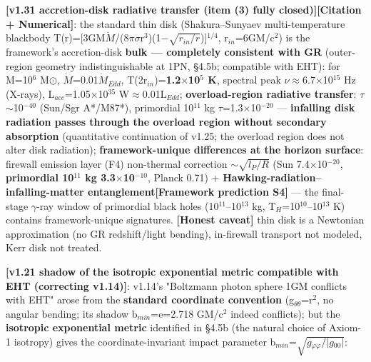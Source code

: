 \documentclass[12pt]{article}
\newcommand{\mtag}[1]{\textbf{[#1]}}
\newcommand{\up}[1]{\ensuremath{^{#1}}}
\newcommand{\down}[1]{\ensuremath{_{#1}}}
\begin{document}
\textbf{\mtag{v1.31 accretion-disk radiative transfer (item (3) fully closed)}}\mtag{Citation + Numerical}: the standard thin disk (Shakura--Sunyaev multi-temperature blackbody T(r)=[3GM\ensuremath{\dot{M}}/(8\ensuremath{\pi}\ensuremath{\sigma}r\up{3})(1\ensuremath{-}\ensuremath{\sqrt{r\down{in}/r}})]\up{1/4}, r\down{in}=6GM/c\up{2}) is the framework's accretion-disk \textbf{bulk --- completely consistent with GR} (outer-region geometry indistinguishable at 1PN, \S{}4.5b; compatible with EHT): for M=10\up{6} M\ensuremath{\odot}, \ensuremath{\dot{M}}=0.01\ensuremath{\dot{M}}\down{Edd}, T(2r\down{in})=\textbf{1.2\ensuremath{\times}10\up{5} K}, spectral peak \ensuremath{\nu}\ensuremath{\approx}6.7\ensuremath{\times}10\up{15} Hz (X-rays), L\down{acc}=1.05\ensuremath{\times}10\up{35} W\ensuremath{\approx}0.01L\down{Edd}; \textbf{overload-region radiative transfer}: \ensuremath{\tau}\ensuremath{\sim}10\up{-40} (Sun/Sgr A*/M87*), primordial 10\up{11} kg \ensuremath{\tau}=1.3\ensuremath{\times}10\up{-20} --- \textbf{infalling disk radiation passes through the overload region without secondary absorption} (quantitative continuation of v1.25; the overload region does not alter disk radiation); \textbf{framework-unique differences at the horizon surface}: firewall emission layer (F4) non-thermal correction \ensuremath{\sim}\ensuremath{\sqrt{l\down{P}/R}} (Sun 7.4\ensuremath{\times}10\up{-20}, \textbf{primordial 10\up{11} kg 3.3\ensuremath{\times}10\up{-10}}, Planck 0.71) + \textbf{Hawking-radiation--infalling-matter entanglement}\mtag{Framework prediction S4} --- the final-stage \ensuremath{\gamma}-ray window of primordial black holes (10\up{11}--10\up{13} kg, T\down{H}=10\up{10}--10\up{13} K) contains framework-unique signatures. \mtag{Honest caveat} thin disk is a Newtonian approximation (no GR redshift/light bending), in-firewall transport not modeled, Kerr disk not treated.

\textbf{\mtag{v1.21 shadow of the isotropic exponential metric compatible with EHT (correcting v1.14)}}: v1.14's "Boltzmann photon sphere 1GM conflicts with EHT" arose from the \textbf{standard coordinate convention} (g\down{\theta{}\theta{}}=r\up{2}, no angular bending; its shadow b\down{min}=e=2.718 GM/c\up{2} indeed conflicts); but the \textbf{isotropic exponential metric} identified in \S{}4.5b (the natural choice of Axiom-1 isotropy) gives the coordinate-invariant impact parameter b\down{min}=\ensuremath{\sqrt{g\down{\varphi{}\varphi{}}/|g\down{00}|}}:
\end{document}

